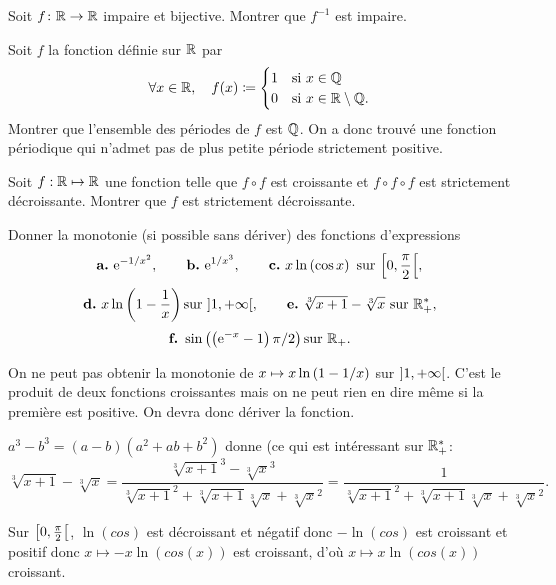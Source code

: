 \documentclass{magnolia}
\begin{document}

Soit $f\colon \mathbb{R} \rightarrow \mathbb{R}$ impaire et bijective. Montrer que $f^{-1}$ est impaire.

Soit $f$ la fonction définie sur $\mathbb{R}$ par
\[\forall x\in\mathbb{R} ,\quad
  f(x)\coloneqq
  \begin{cases}
  1 & \text{si $x\in\mathbb{Q}$}\\
  0 & \text{si $x\in\mathbb{R}\setminus\mathbb{Q}$.}  
  \end{cases}\]
Montrer que l'ensemble des périodes de $f$ est $\mathbb{Q}$. On a donc trouvé une
fonction périodique qui n'admet pas de plus petite période strictement positive.



Soit $f:\mathbb{R}\mapsto\mathbb{R}$ une fonction telle que $f\circ f$ est croissante et
$f\circ f\circ f$ est strictement décroissante. Montrer que $f$ est
strictement décroissante.




Donner la monotonie (si possible sans dériver) des fonctions d'expressions
\[\textbf{a.}\ {\rm e}^{-1/x^2}, \qquad \textbf{b.}\ {\rm e}^{1/x^3}, \qquad \textbf{c.}\ x \ln\left(\cos x\right)
  \ \text{sur $\left[0,\frac{\pi}{2}\right[$},\]
\[\textbf{d.}\ x\ln\left(1-\frac{1}{x}\right) \text{sur $\left]1,+\infty\right[$},\qquad
\textbf{e.}\ \sqrt[3]{x+1}-\sqrt[3]{x} \text{ sur $\mathbb{R}_+^*$},\]
\[\textbf{f.}\ \sin\left(\left({\rm e}^{-x}-1\right)\pi/2\right) \text{sur $\mathbb{R}_+$.}\]
\begin{sol}
On ne peut pas obtenir la monotonie de
$x\mapsto x \ln\left(1-1/x\right)$ sur $\left]1,+\infty\right[$.
C'est le produit de deux fonctions croissantes mais on ne peut rien en dire même si la première est positive. On devra donc dériver la fonction.

$a^3-b^3=(a-b)(a^2+ab+b^2)$ donne (ce qui est intéressant sur $\mathbb{R}_+^*$:
$$\sqrt[3]{x+1}-\sqrt[3]{x}=\frac{\sqrt[3]{x+1}^3-\sqrt[3]{x}^3}{\sqrt[3]{x+1}^2+\sqrt[3]{x+1}\sqrt[3]{x}+\sqrt[3]{x}^2}=\frac{1}{\sqrt[3]{x+1}^2+\sqrt[3]{x+1}\sqrt[3]{x}+\sqrt[3]{x}^2}.$$

Sur $\left[0,\frac{\pi}{2}\right[$, $\ln(cos)$ est décroissant et négatif donc $-\ln(cos)$ est croissant et positif donc $x\mapsto -x\ln(cos(x))$ est croissant, d'où $x\mapsto x\ln(cos(x))$ croissant.

\end{sol}

\end{document}
